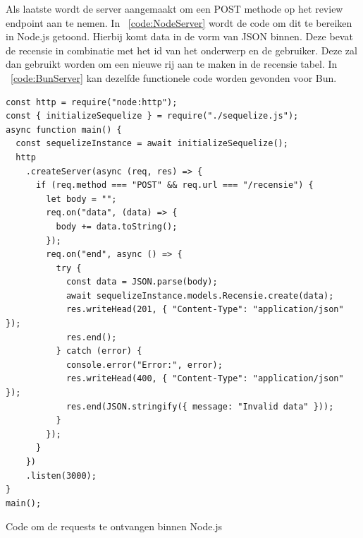 Als laatste wordt de server aangemaakt om een POST methode op het review endpoint aan te nemen.
In ~\ref{code:NodeServer} wordt de code om dit te bereiken in Node.js getoond. Hierbij komt data in de vorm van JSON binnen.
Deze bevat de recensie in combinatie met het id van het onderwerp en de gebruiker.
Deze zal dan gebruikt worden om een nieuwe rij aan te maken in de recensie tabel.
In ~\ref{code:BunServer} kan dezelfde functionele code worden gevonden voor Bun.

\begin{listing}[H]
  \centering
  \begin{verbatim}
const http = require("node:http");
const { initializeSequelize } = require("./sequelize.js");
async function main() {
  const sequelizeInstance = await initializeSequelize();
  http
    .createServer(async (req, res) => {
      if (req.method === "POST" && req.url === "/recensie") {
        let body = "";
        req.on("data", (data) => {
          body += data.toString();
        });
        req.on("end", async () => {
          try {
            const data = JSON.parse(body);
            await sequelizeInstance.models.Recensie.create(data);
            res.writeHead(201, { "Content-Type": "application/json" });
            res.end();
          } catch (error) {
            console.error("Error:", error);
            res.writeHead(400, { "Content-Type": "application/json" });
            res.end(JSON.stringify({ message: "Invalid data" }));
          }
        });
      }
    })
    .listen(3000);
}
main();
\end{verbatim}
\caption{\label{code:NodeServer}Code om de requests te ontvangen binnen Node.js}
\end{listing}
